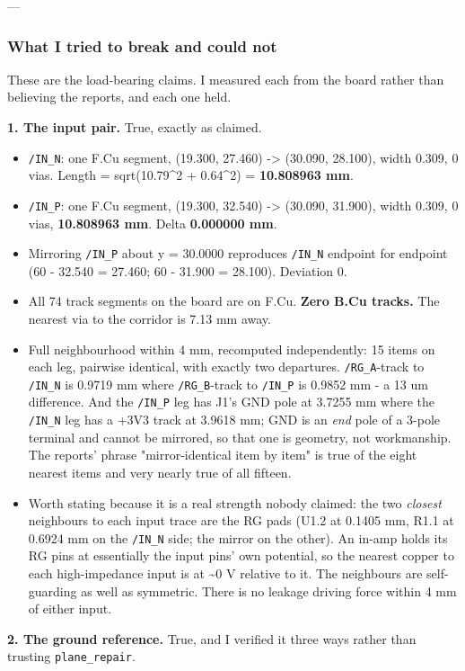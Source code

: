 \documentclass[11pt,a4paper]{article}
\begin{document}
---

\subsubsection*{What I tried to break and could not}
These are the load-bearing claims. I measured each from the board rather than believing the reports, and each one held.

\textbf{1. The input pair.} True, exactly as claimed.

\begin{itemize}
\item \texttt{/IN\_N}: one F.Cu segment, (19.300, 27.460) -\textgreater{} (30.090, 28.100), width 0.309,
0 vias. Length = sqrt(10.79\textasciicircum{}2 + 0.64\textasciicircum{}2) = \textbf{10.808963 mm}.
\item \texttt{/IN\_P}: one F.Cu segment, (19.300, 32.540) -\textgreater{} (30.090, 31.900), width 0.309,
0 vias, \textbf{10.808963 mm}. Delta \textbf{0.000000 mm}.
\item Mirroring \texttt{/IN\_P} about y = 30.0000 reproduces \texttt{/IN\_N} endpoint for endpoint
(60 - 32.540 = 27.460; 60 - 31.900 = 28.100). Deviation 0.
\item All 74 track segments on the board are on F.Cu. \textbf{Zero B.Cu tracks.} The
nearest via to the corridor is 7.13 mm away.
\item Full neighbourhood within 4 mm, recomputed independently: 15 items on each
leg, pairwise identical, with exactly two departures. \texttt{/RG\_A}-track to
\texttt{/IN\_N} is 0.9719 mm where \texttt{/RG\_B}-track to \texttt{/IN\_P} is 0.9852 mm - a 13 um
difference. And the \texttt{/IN\_P} leg has J1's GND pole at 3.7255 mm where the
\texttt{/IN\_N} leg has a +3V3 track at 3.9618 mm; GND is an \emph{end} pole of a 3-pole
terminal and cannot be mirrored, so that one is geometry, not workmanship.
The reports' phrase "mirror-identical item by item" is true of the eight
nearest items and very nearly true of all fifteen.
\item Worth stating because it is a real strength nobody claimed: the two \emph{closest}
neighbours to each input trace are the RG pads (U1.2 at 0.1405 mm, R1.1 at
0.6924 mm on the \texttt{/IN\_N} side; the mirror on the other). An in-amp holds its
RG pins at essentially the input pins' own potential, so the nearest copper to
each high-impedance input is at \textasciitilde{}0 V relative to it. The neighbours are
self-guarding as well as symmetric. There is no leakage driving force within
4 mm of either input.
\end{itemize}
\textbf{2. The ground reference.} True, and I verified it three ways rather than trusting \texttt{plane\_repair}.
\end{document}
